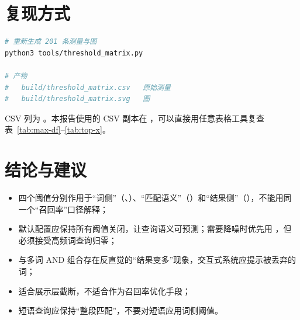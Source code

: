 \section{复现方式}

\begin{lstlisting}[language=bash]
# 重新生成 201 条测量与图
python3 tools/threshold_matrix.py

# 产物
#   build/threshold_matrix.csv   原始测量
#   build/threshold_matrix.svg   图
\end{lstlisting}

CSV 列为 。本报告使用的 CSV 副本在 ，可以直接用任意表格工具复查表~\ref{tab:max-df}–\ref{tab:top-x}。

\section{结论与建议}

\begin{itemize}
  \item 四个阈值分别作用于“词侧”（、）、“匹配语义”（）和“结果侧”（），不能用同一个“召回率”口径解释；
  \item 默认配置应保持所有阈值关闭，让查询语义可预测；需要降噪时优先用 ，但必须接受高频词查询归零；
  \item {} 与多词 AND 组合存在反直觉的“结果变多”现象，交互式系统应提示被丢弃的词；
  \item {} 适合展示层截断，不适合作为召回率优化手段；
  \item 短语查询应保持“整段匹配”，不要对短语应用词侧阈值。
\end{itemize}



